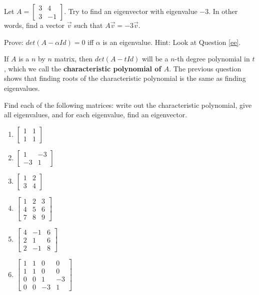 \bq Let $A=\begin{bmatrix} 3&4\\3&-1 \end{bmatrix}$. Try to find an eigenvector with eigenvalue $-3$. In other words, find a vector $\vec{v}$ such that $A\vec{v}=-3\vec{v}$.
\eq

\bq Prove: $det(A- \alpha Id)=0$ iff $\alpha$ is an eigenvalue. Hint: Look at Question \ref{ee}.
\eq

If $A$ is a $n$ by $n$ matrix, then $det(A- t Id)$ will be a $n$-th degree polynomial in $t$, which we call the \textbf{characteristic polynomial of $A$}. The previous question shows that finding roots of the characteristic polynomial is the same as finding eigenvalues.

\bq Find each of the following matrices: write out the characteristic polynomial, give all eigenvalues, and for each eigenvalue, find an eigenvector.
\begin{enumerate}
\item $\begin{bmatrix} 1&1 \\1&1 \end{bmatrix}$
\item $\begin{bmatrix} 1&-3 \\-3&1 \end{bmatrix}$
\item $\begin{bmatrix} 1&2 \\3&4 \end{bmatrix}$
\item $\begin{bmatrix} 1&2&3 \\4&5&6\\7&8&9 \end{bmatrix}$
\item $\begin{bmatrix} 4&-1&6\\2&1&6\\2&-1&8 \end{bmatrix}$
\item $\begin{bmatrix} 1&1&0&0\\1&1&0&0\\0&0&1&-3\\0&0&-3&1 \end{bmatrix}$
\end{enumerate}
\eq
\begin{annotation}
\end{annotation}

